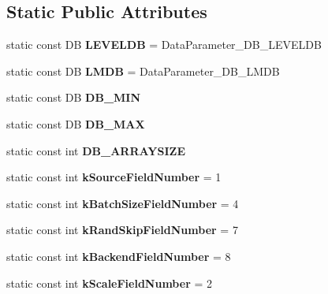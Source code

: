 \subsection*{Static Public Attributes}
\begin{DoxyCompactItemize}
\item 
\mbox{\label{classcaffe_1_1_data_parameter_a084e1af6ab585328e9abf4e262df6801}} 
static const DB {\bfseries L\+E\+V\+E\+L\+DB} = Data\+Parameter\+\_\+\+D\+B\+\_\+\+L\+E\+V\+E\+L\+DB
\item 
\mbox{\label{classcaffe_1_1_data_parameter_acb27c8caf15b87fd0a43b9bed3efff0b}} 
static const DB {\bfseries L\+M\+DB} = Data\+Parameter\+\_\+\+D\+B\+\_\+\+L\+M\+DB
\item 
static const DB {\bfseries D\+B\+\_\+\+M\+IN}
\item 
static const DB {\bfseries D\+B\+\_\+\+M\+AX}
\item 
static const int {\bfseries D\+B\+\_\+\+A\+R\+R\+A\+Y\+S\+I\+ZE}
\item 
\mbox{\label{classcaffe_1_1_data_parameter_a186b2ca8bdc94d2c07eed818624490f0}} 
static const int {\bfseries k\+Source\+Field\+Number} = 1
\item 
\mbox{\label{classcaffe_1_1_data_parameter_a1b0f495f2bb94496658244591f7dea04}} 
static const int {\bfseries k\+Batch\+Size\+Field\+Number} = 4
\item 
\mbox{\label{classcaffe_1_1_data_parameter_afb0895b0e16367837cd7f2acbe7052e7}} 
static const int {\bfseries k\+Rand\+Skip\+Field\+Number} = 7
\item 
\mbox{\label{classcaffe_1_1_data_parameter_a89097afffc7b4384338ec56ad0dada57}} 
static const int {\bfseries k\+Backend\+Field\+Number} = 8
\item 
\mbox{\label{classcaffe_1_1_data_parameter_a9e7e8ede3877f31e2db021dd8bf18b3e}} 
static const int {\bfseries k\+Scale\+Field\+Number} = 2
\item 
\mbox{\label{classcaffe_1_1_data_parameter_a2c9c9fd44e73b66f66b932961e566ff2}} 

\end{DoxyCompactItemize}

